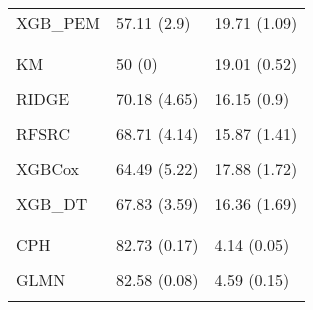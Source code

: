 \begin{longtable}[t]{lll}
\hspace{1em}XGB\_PEM & 57.11 (2.9) & 19.71 (1.09)\\
\hspace{1em}\cellcolor{gray!10}{XGB\_DT} & \cellcolor{gray!10}{57.58 (1.9)} & \cellcolor{gray!10}{20.37 (1.04)}\\
\addlinespace[0.3em]
\multicolumn{3}{l}{\textbf{mgus}}\\
\hspace{1em}KM & 50 (0) & 19.01 (0.52)\\
\hspace{1em}\cellcolor{gray!10}{CPH} & \cellcolor{gray!10}{70.3 (4.55)} & \cellcolor{gray!10}{15.42 (1.83)}\\
\hspace{1em}RIDGE & 70.18 (4.65) & 16.15 (0.9)\\
\hspace{1em}\cellcolor{gray!10}{GLMN} & \cellcolor{gray!10}{69.65 (3.58)} & \cellcolor{gray!10}{16.34 (0.81)}\\
\hspace{1em}RFSRC & 68.71 (4.14) & 15.87 (1.41)\\
\hspace{1em}\cellcolor{gray!10}{RFSRC\_DT} & \cellcolor{gray!10}{66.3 (4)} & \cellcolor{gray!10}{16.65 (1.77)}\\
\hspace{1em}XGBCox & 64.49 (5.22) & 17.88 (1.72)\\
\hspace{1em}\cellcolor{gray!10}{XGB\_PEM} & \cellcolor{gray!10}{68.3 (4.71)} & \cellcolor{gray!10}{16.11 (1.57)}\\
\hspace{1em}XGB\_DT & 67.83 (3.59) & 16.36 (1.69)\\
\addlinespace[0.3em]
\multicolumn{3}{l}{\textbf{nafld1}}\\
\hspace{1em}\cellcolor{gray!10}{KM} & \cellcolor{gray!10}{50 (0)} & \cellcolor{gray!10}{5.23 (0.08)}\\
\hspace{1em}CPH & 82.73 (0.17) & 4.14 (0.05)\\
\hspace{1em}\cellcolor{gray!10}{RIDGE} & \cellcolor{gray!10}{82.52 (0.11)} & \cellcolor{gray!10}{4.6 (0.1)}\\
\hspace{1em}GLMN & 82.58 (0.08) & 4.59 (0.15)\\
\hspace{1em}\cellcolor{gray!10}{RFSRC} & \cellcolor{gray!10}{83.22 (0.45)} & \cellcolor{gray!10}{4.11 (0.03)}\\

\end{longtable}
